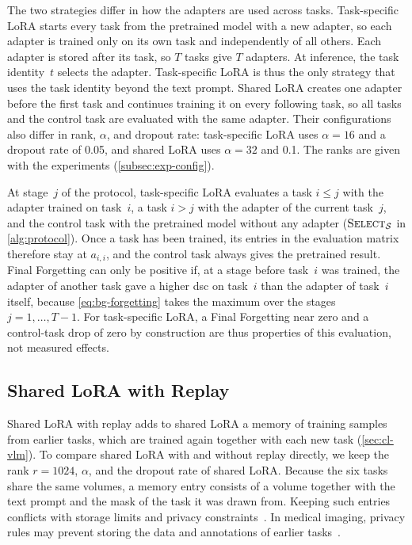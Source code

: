 The two strategies differ in how the adapters are used across tasks.
Task-specific LoRA starts every task from the pretrained model with a new adapter, so each adapter is trained only on its own task and independently of all others.
Each adapter is stored after its task, so $T$ tasks give $T$ adapters.
At inference, the task identity~$t$ selects the adapter.
Task-specific LoRA is thus the only strategy that uses the task identity beyond the text prompt.
Shared LoRA creates one adapter before the first task and continues training it on every following task, so all tasks and the control task are evaluated with the same adapter.
Their configurations also differ in rank, $\alpha$, and dropout rate: task-specific LoRA uses $\alpha = 16$ and a dropout rate of 0.05, and shared LoRA uses $\alpha = 32$ and 0.1.
The ranks are given with the experiments (\cref{subsec:exp-config}).

At stage~$j$ of the protocol, task-specific LoRA evaluates a task $i \le j$ with the adapter trained on task~$i$, a task $i > j$ with the adapter of the current task~$j$, and the control task with the pretrained model without any adapter ($\textsc{Select}_{\mathcal{S}}$ in \cref{alg:protocol}).
Once a task has been trained, its entries in the evaluation matrix therefore stay at $a_{i,i}$, and the control task always gives the pretrained result.
Final Forgetting can only be positive if, at a stage before task~$i$ was trained, the adapter of another task gave a higher \gls{dsc} on task~$i$ than the adapter of task~$i$ itself, because \cref{eq:bg-forgetting} takes the maximum over the stages $j = 1, \dots, T-1$.
For task-specific LoRA, a Final Forgetting near zero and a control-task drop of zero by construction are thus properties of this evaluation, not measured effects.

\subsection{Shared LoRA with Replay}
\label{subsec:method-replay}

Shared LoRA with replay adds to shared LoRA a memory of training samples from earlier tasks, which are trained again together with each new task (\cref{sec:cl-vlm}).
To compare shared LoRA with and without replay directly, we keep the rank $r = 1024$, $\alpha$, and the dropout rate of shared LoRA.
Because the six tasks share the same volumes, a memory entry consists of a volume together with the text prompt and the mask of the task it was drawn from.
Keeping such entries conflicts with storage limits and privacy constraints~\cite[Sec.~1]{delange2022}.
In medical imaging, privacy rules may prevent storing the data and annotations of earlier tasks~\cite{zhang2023continuallearningabdominalmultiorgan}.

